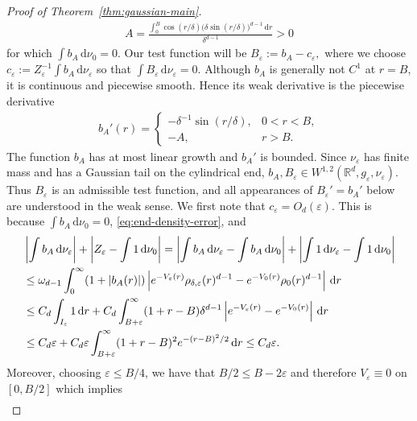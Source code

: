 \documentclass[11pt,reqno]{amsart}
\numberwithin{equation}{section}
\theoremstyle{definition}
\theoremstyle{remark}
\newcommand{\ud}{\mathrm{d}}
\newcommand{\0}{\emptyset}
\newcommand{\veps}{\varepsilon}
\begin{document}
\begin{proof}[Proof of Theorem~\ref{thm:gaussian-main}]
\begin{align}
        A
        =
        \frac{
        \int_0^B
        \cos(r/\delta)\bigl(\delta\sin(r/\delta)\bigr)^{d-1}\,\ud r
        }{
        \delta^{d-1}
        }
        >0
\end{align}
for which \(\int b_A\,\ud\nu_0=0\). Our test function will be $B_\veps:=b_A-c_\veps,$ where we choose $c_\veps:=Z_\veps^{-1} \int b_A\,\ud\nu_\veps$ so that \(\int B_\veps\,\ud\nu_\veps=0\). Although \(b_A\) is generally not \(C^1\) at \(r=B\), it is continuous and piecewise smooth. Hence its weak derivative is the piecewise derivative
\begin{align}
        b_A'(r)=
        \begin{cases}
        -\delta^{-1}\sin(r/\delta),&0< r<B,\\
        -A,&r>B.
        \end{cases}
\end{align}
The function $b_A$ has at most linear growth and $b_A'$ is bounded. Since
$\nu_\veps$ has finite mass and has a Gaussian tail on the cylindrical end,
$b_A,B_\veps\in W^{1,2}(\mathbb R^d,g_\veps,\nu_\veps)$. Thus $B_\veps$ is an admissible test function, and all appearances of $B_\veps'=b_A'$ below are understood in the weak sense. We first note that
\(c_\veps=O_d(\veps)\). This is because \(\int b_A\,\ud\nu_0=0\),
\eqref{eq:end-density-error}, and
\begin{align}
        &\left|\int b_A\,\ud\nu_\veps\right|
        +
        \left|Z_\veps-\int1\,\ud\nu_0\right|
        =
        \left|\int b_A\,\ud\nu_\veps-\int b_A\,\ud\nu_0\right|
        +
        \left|\int1\,\ud\nu_\veps-\int1\,\ud\nu_0\right| \notag\\
        &\leq
        \omega_{d-1}
        \int_0^\infty
        (1+|b_A(r)|)\left|e^{-V_\veps(r)}\rho_{\delta,\veps}(r)^{d-1}
        -
        e^{-V_0(r)}\rho_0(r)^{d-1}\right|\,\ud r \notag\\
        &\leq
        C_d\int_{I_\veps}1\,\ud r
        +
        C_d\int_{B+\veps}^\infty
        (1+r-B)\delta^{d-1}
        \left|e^{-V_\veps(r)}-e^{-V_0(r)}\right|
        \,\ud r \notag\\
        &\leq
        C_d\veps
        +
        C_d\veps
        \int_{B+\veps}^\infty
        (1+r-B)^2e^{-(r-B)^2/2}\,\ud r
        \leq
        C_d\veps.
\end{align}
Moreover, choosing $\veps\leq B/4$, we have that $B/2\leq B-2\veps$ and therefore $V_\veps\equiv 0$ on $[0,B/2]$ which implies
\begin{align}

\end{align}
\end{proof}
\end{document}
